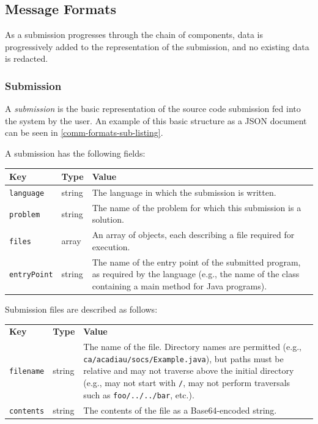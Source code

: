 \documentclass[11pt,letterpaper]{article}
\begin{document}
\subsection{Message Formats}
\label{comm-formats}

As a submission progresses through the chain of components, data is
progressively added to the representation of the submission, and no existing
data is redacted.

\subsubsection{Submission}
\label{comm-formats-sub}

A \emph{submission} is the basic representation of the source code submission
fed into the system by the user. An example of this basic structure as a JSON
document can be seen in \autoref{comm-formats-sub-listing}.

A submission has the following fields:

\nopagebreak
\begin{tabulary}{\textwidth}{ | l | l | L | }
    \hline
    \textbf{Key} & \textbf{Type} & \textbf{Value} \\
    \hline
    \texttt{language} & string & The language in which the submission is
        written. \\
    \hline
    \texttt{problem} & string & The name of the problem for which this
        submission is a solution. \\
    \hline
    \texttt{files} & array & An array of objects, each describing a file
        required for execution. \\
    \hline
    \texttt{entryPoint} & string & The name of the entry point of the submitted
        program, as required by the language (e.g., the name of the class
        containing a main method for Java programs). \\
    \hline
\end{tabulary}

Submission files are described as follows:

\nopagebreak
\begin{tabulary}{\textwidth}{ | l | l | L | }
    \hline
    \textbf{Key} & \textbf{Type} & \textbf{Value} \\
    \texttt{filename} & string & The name of the file. Directory names are permitted
        (e.g., \texttt{ca/acadiau/socs/Example.java}), but paths must be
        relative and may not traverse above the initial directory (e.g., may
        not start with \texttt{/}, may not perform traversals such as
        \texttt{foo/../../bar}, etc.). \\
    \hline
    \texttt{contents} & string & The contents of the file as a Base64-encoded
        string. \\
    \hline
\end{tabulary}
\end{document}
